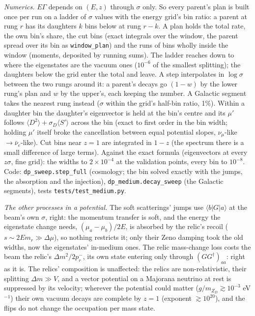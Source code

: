 \documentclass[11pt,a4paper]{article}
\newcommand{\file}[1]{\nolinkurl{#1}}
\newcommand{\mzd}{m_{Z_D}}
\begin{document}
\emph{Numerics.} $E\Gamma$ depends on $(E, z)$ through $\sigma$ only. So every parent's plan is built once per run on a
ladder of $\sigma$ values with the energy grid's bin ratio: a parent at rung $r$ has its daughters $k$ bins below at
rung $r - k$. A plan holds the total rate, the own bin's share, the cut bins (exact integrals over the window, the parent
spread over its bin as \texttt{window\_plan}) and the runs of bins wholly inside the window (moments, deposited by
running sums). The ladder reaches down to where the eigenstates are the vacuum ones ($10^{-6}$ of the smallest
splitting); the daughters below the grid enter the total and leave. A step interpolates in $\log\sigma$ between the two
rungs around it: a parent's decays go $(1-w)$ by the lower rung's plan and $w$ by the upper's, each keeping the number.
A Galactic segment takes the nearest rung instead ($\sigma$ within the grid's half-bin ratio, 1\%).
Within a daughter bin the daughter's eigenvector is held at the bin's centre and its $\mu'$ follows
$\langle D^2\rangle + \sigma_D\langle S'\rangle$ across the bin (exact to first order in the bin width; holding $\mu'$
itself broke the cancellation between equal potential slopes, $\nu_\mu$-like $\to\bar\nu_e$-like). Cut bins near
$z = 1$ are integrated in $1 - z$ (the spectrum there is a small difference of large terms). Against the exact formula
(eigenvectors at every $z\sigma$, fine grid): the widths to $2\times10^{-4}$ at the validation points, every bin to
$10^{-8}$. Code: \texttt{dp\_sweep.step\_full} (cosmology; the bin solved exactly with the jumps, the absorption and the
injection), \texttt{dp\_medium.decay\_sweep} (the Galactic segments), tests \file{tests/test\_medium.py}.

\emph{The other processes in a potential.} The soft scatterings' jumps use $\langle b|G|a\rangle$ at the beam's own
$\sigma$, right: the momentum transfer is soft, and the energy the eigenstate change needs, $(\mu_a-\mu_b)/2E$, is
absorbed by the relic's recoil ($s\sim2Em_r\gg\Delta\mu$), so nothing restricts it; only their Zeno damping took the
old widths, now the eigenstates' in-medium ones. The relic mass-change loss costs the beam the relic's
$\Delta m^2/2p_r^-$, its own state entering only through $(GG^\dagger)_{aa}$: right as it is. The relics' composition
is unaffected: the relics are non-relativistic, their splitting $\Delta m\gg V$, and a vector potential on a Majorana
neutrino at rest is suppressed by its velocity; wherever the potential could matter ($g/\mzd\gtrsim10^{-3}$ eV$^{-1}$)
their own vacuum decays are complete by $z = 1$ (exponent $\gtrsim10^{20}$), and the flips do not change the occupation
per mass state.
\end{document}
